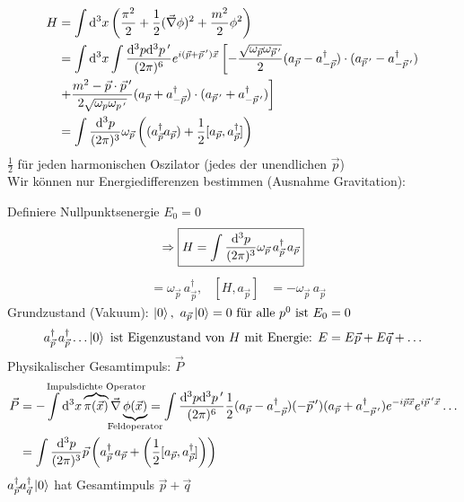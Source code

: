	\begin{align*}
		H &= \int \mathrm{d}^3 x 
		\left(
			\frac{\pi^2}{2} + \frac{1}{2} (\vec{\nabla} \phi)^2 + \frac{m^2}{2} \phi^2
		\right) \\
		&= \int \mathrm{d}^3 x \int \frac{\mathrm{d}^3 p \mathrm{d}^3 p\,'}{(2\pi)^6} e^{i (\vec{p} + \vec{p}\,')\vec{x}} 
		\left[
			- \frac{\sqrt{\omega_{\vec{p}} \omega_{\vec{p}\,'}}}{2} 
			(a_{\vec{p}} - a_{-\vec{p}}^\dagger) \cdot (a_{\vec{p}\,'} - a_{-\vec{p}\,'}^\dagger)
		\right.\\
		&\left.
			+ \frac{m^2 - \vec{p} \cdot \vec{p}\,'}{2\sqrt{\omega_p \omega_{p\,'}}}
			(a_{\vec{p}} + a_{-\vec{p}}^\dagger) \cdot (a_{\vec{p}\,'} + a_{-\vec{p}\,'}^\dagger)
		\right] \\
		&= \int \frac{\mathrm{d}^3 p}{(2 \pi)^3} \omega_{\vec{p}} 
		\left(
			(a^\dagger_{\vec{p}} a_{\vec{p}}) + \frac{1}{2} [a_{\vec{p}}, a^\dagger_{\vec{p}}]
		\right)
	\end{align*}
$\frac{1}{2}$ für jeden harmonischen Oszilator (jedes der unendlichen $\vec{p}$)
\\ 
Wir können nur Energiedifferenzen bestimmen (Ausnahme Gravitation):
 
Definiere Nullpunktsenergie $E_0 = 0$
	\begin{align*}
		\Rightarrow \boxed{H = \int \frac{\mathrm{d}^3 p}{(2 \pi)^3} \omega_{\vec{p}}\, a_{\vec{p}}^\dagger \,a_{\vec{p}}}
	\end{align*}
	\begin{align*}
		[H, a_{\vec{p}}^\dagger] &= \omega_{\vec{p}}\, a_{\vec{p}}^\dagger ,&
		[H, a_{\vec{p}}] &= - \omega_{\vec{p}} \,a_{\vec{p}}
	\end{align*}
Grundzustand (Vakuum): 
$\ket{0}, ~a_{\vec{p}}\ket{0} = 0 ~\text{für alle }p^0 \text{ ist }E_0 = 0$
	\begin{align*}
		a_{\vec{p}}^\dagger \,a_{\vec{p}}^\dagger \ldots \ket{0} \text{ ist Eigenzustand von } H \text{ mit Energie: }  E= E\vec{p} + E\vec{q} + \ldots
	\end{align*}
Physikalischer Gesamtimpuls: $\vec{P}$
	\begin{align*}
		\vec{P} &= - \int \diff^3 x \overbrace{\pi (\vec{x})}^{\mathclap{\text{Impulsdichte Operator}}} \vec{\nabla} \underbrace{\phi(\vec{x})}_{\mathclap{\text{Feldoperator}}}
		= \int \frac{\diff^3 p \diff^3 p\,'}{(2\pi)^6} \frac{1}{2} (a_{\vec{p}} - a_{-\vec{p}}^\dagger) (- \vec{p}\,') (a_{\vec{p}} + a_{-\vec{p}\,'}^\dagger) e^{-i\vec{p} \vec{x}} e^{i \vec{p}\,' \vec{x}} \ldots \\
		&= \int \frac{\diff^3 p}{(2\pi)^3} \vec{p} 
		\left(
			a_{\vec{p}}^\dagger \,a_{\vec{p}} + \left(\frac{1}{2} [a_{\vec{p}}, a_{\vec{p}}^\dagger] \right)
		\right)
	\end{align*}
$a_{\vec{p}}^\dagger a_{\vec{q}}^\dagger \ket{0}$ hat Gesamtimpuls $\vec{p} + \vec{q}$

